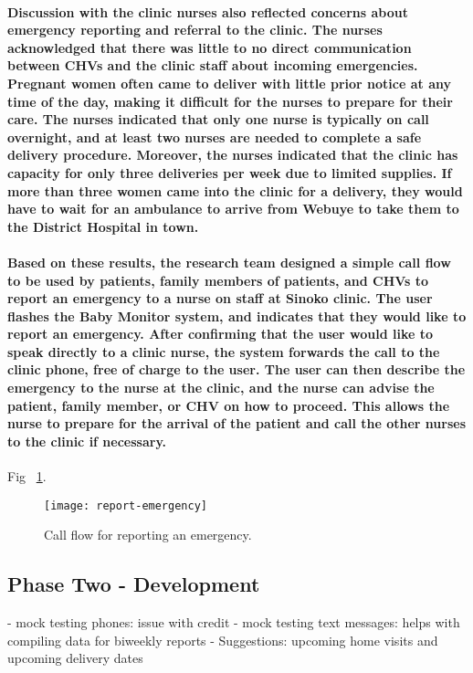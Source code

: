 {\paragraph{Discussion with the clinic nurses also reflected concerns about emergency reporting and referral to the clinic. The nurses acknowledged that there was little to no direct communication between CHVs and the clinic staff about incoming emergencies. Pregnant women often came to deliver with little prior notice at any time of the day, making it difficult for the nurses to prepare for their care. The nurses indicated that only one nurse is typically on call overnight, and at least two nurses are needed to complete a safe delivery procedure. Moreover, the nurses indicated that the clinic has capacity for only three deliveries per week due to limited supplies. If more than three women came into the clinic for a delivery, they would have to wait for an ambulance to arrive from Webuye to take them to the District Hospital in town.}

\paragraph{Based on these results, the research team designed a simple call flow to be used by patients, family members of patients, and CHVs to report an emergency to a nurse on staff at Sinoko clinic. The user flashes the Baby Monitor system, and indicates that they would like to report an emergency. After confirming that the user would like to speak directly to a clinic nurse, the system forwards the call to the clinic phone, free of charge to the user. The user can then describe the emergency to the nurse at the clinic, and the nurse can advise the patient, family member, or CHV on how to proceed. This allows the nurse to prepare for the arrival of the patient and call the other nurses to the clinic if necessary.}

Fig ~\ref{fig:emergency}.
\begin{figure}[tbp]
	\begin{center}
	\texttt{[image: report-emergency]}
	\end{center}
	\caption{Call flow for reporting an emergency.}
	\label{fig:emergency}
\end{figure}

\subsection{Phase Two - Development}
- mock testing phones: issue with credit
- mock testing text messages: helps with compiling data for biweekly reports
- Suggestions: upcoming home visits and upcoming delivery dates



}
